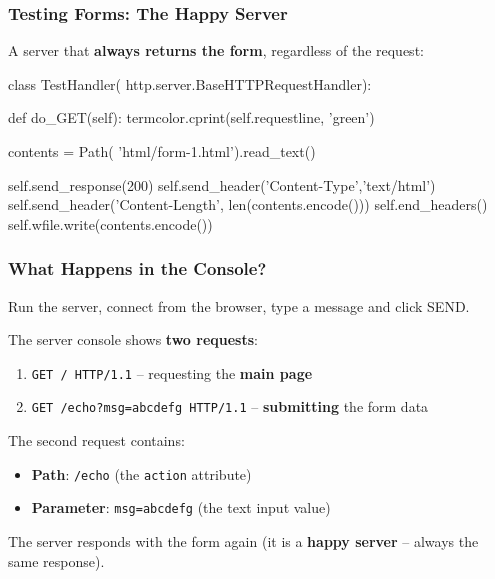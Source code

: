 \documentclass[xcolor=table]{beamer}
\begin{document}
\begin{frame}[fragile]
\frametitle{Testing Forms: The Happy Server}

A server that \textbf{always returns the form}, regardless of the request:

\vspace{0.1cm}

\begin{python}
class TestHandler(
        http.server.BaseHTTPRequestHandler):

    def do_GET(self):
        termcolor.cprint(self.requestline, 'green')

        contents = Path(
            'html/form-1.html').read_text()

        self.send_response(200)
        self.send_header('Content-Type','text/html')
        self.send_header('Content-Length',
                         len(contents.encode()))
        self.end_headers()
        self.wfile.write(contents.encode())
\end{python}

\end{frame}

\begin{frame}
\frametitle{What Happens in the Console?}

Run the server, connect from the browser, type a message and click SEND.

\vspace{0.3cm}

The server console shows \textbf{two requests}:

\vspace{0.2cm}

\begin{enumerate}
\item \texttt{GET / HTTP/1.1} -- requesting the \textbf{main page}
\item \texttt{GET /echo?msg=abcdefg HTTP/1.1} -- \textbf{submitting} the form data
\end{enumerate}

\vspace{0.3cm}

The second request contains:
\begin{itemize}
\item \textbf{Path}: \texttt{/echo} (the \texttt{action} attribute)
\item \textbf{Parameter}: \texttt{msg=abcdefg} (the text input value)
\end{itemize}

\vspace{0.2cm}

The server responds with the form again (it is a \textbf{happy server} -- always the same response).

\end{frame}
\end{document}
